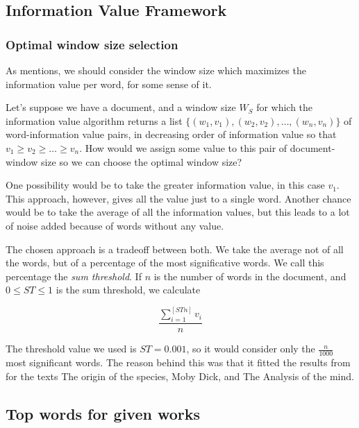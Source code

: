 \documentclass{pnastwo}
\begin{document}
\begin{article}
\subsection{Information Value Framework}
\medskip

\subsubsection{Optimal window size selection}
As \cite{DARWIN} mentions, we should consider the window size which maximizes the information value per word, for some sense of it.

Let's suppose we have a document, and a window size $W_S$ for which the information value algorithm returns a list $\{(w_1, v_1), (w_2, v_2), \dots ,(w_n, v_n) \}$ of word-information value pairs, in decreasing order of information value so that $v_1 \geq v_2 \geq \dots \geq v_n$. How would we assign some value to this pair of document-window size so we can choose the optimal window size?

One possibility would be to take the greater information value, in this case $v_1$. This approach, however, gives all the value just to a single word. Another chance would be to take the average of all the information values, but this leads to a lot of noise added because of words without any value.


The chosen approach is a tradeoff between both. We take the average not of all the words, but of a percentage of the most significative words. We call this percentage the \emph{sum threshold}. If $n$ is the number of words in the document, and $0 \leq ST \leq 1$ is the sum threshold, we calculate

\begin{equation}
  \frac{\sum_{i=1}^{[ST n]}v_i}{n} 
\end{equation}


The threshold value we used is $ST=0.001$, so it would consider only the $\frac{n}{1000}$ most significant words. The reason behind this was that it fitted the results from \cite{DARWIN} for the texts The origin of the species, Moby Dick, and  The Analysis of the mind.

\subsection{Top words for given works}


\end{article}
\end{document}

